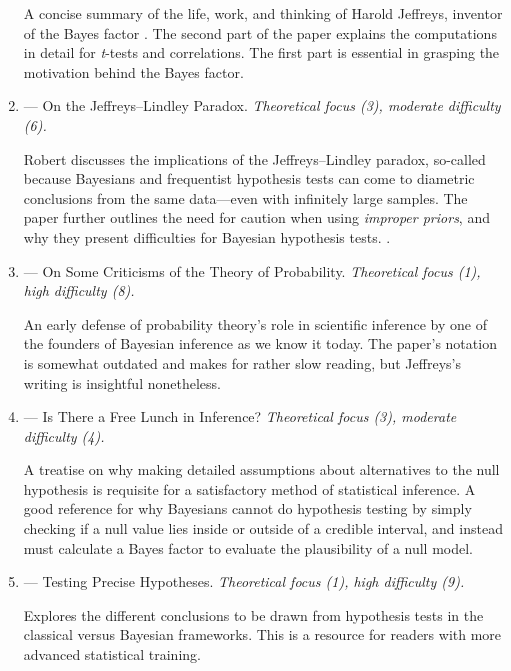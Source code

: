 \begin{enumerate}
A concise summary of the life, work, and thinking of Harold Jeffreys, inventor of the Bayes factor \cite<see also>{EtzOrigin}. The second part of the paper explains the computations in detail for \textit{t}-tests and correlations. The first part is essential in grasping the motivation behind the Bayes factor.

\item
\textbf{} --- On the Jeffreys--Lindley Paradox. \emph{Theoretical focus (3), moderate difficulty (6).}

Robert discusses the implications of the Jeffreys--Lindley paradox, so-called because Bayesians and frequentist hypothesis tests can come to diametric conclusions from the same data---even with infinitely large samples. The paper further outlines the need for caution when using \textit{improper priors}, and why they present difficulties for Bayesian hypothesis tests. \cite<For more on this topic see>{degroot1982lindley}.

\item
\textbf{} --- On Some Criticisms of the Theory of Probability. \emph{Theoretical focus (1), high difficulty (8).}

An early defense of probability theory's role in scientific inference by one of the founders of Bayesian inference as we know it today. The paper's notation is somewhat outdated and makes for rather slow reading, but Jeffreys's writing is insightful nonetheless.

\item
\textbf{} --- Is There a Free Lunch in Inference? \emph{Theoretical focus (3), moderate difficulty (4).}

A treatise on why making detailed assumptions about alternatives to the null hypothesis is requisite for a satisfactory method of statistical inference. A good reference for why Bayesians cannot do hypothesis testing by simply checking if a null value lies inside or outside of a credible interval, and instead must calculate a Bayes factor to evaluate the plausibility of a null model.

\item
\textbf{} --- Testing Precise Hypotheses. \emph{Theoretical focus (1), high difficulty (9).}

Explores the different conclusions to be drawn from hypothesis tests in the classical versus Bayesian frameworks. This is a resource for readers with more advanced statistical training.


\end{enumerate}
